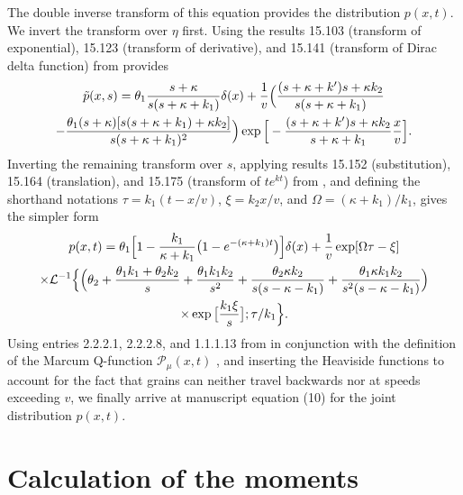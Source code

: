 The double inverse transform of this equation provides the distribution $p(x,t)$.
We invert the transform over $\eta$ first.
Using the results 15.103 (transform of exponential), 15.123 (transform of derivative), and 15.141 (transform of Dirac delta function) from \citet{Arfken1985} provides 
\begin{multline} \tilde{p}(x,s) = \theta_1 \frac{s+\kappa}{s(s+\kappa + k_1)}\delta(x) + \frac{1}{v} \Big(\frac{(s+\kappa+k')s+\kappa k_2}{s(s+\kappa+k_1)} \\- \frac{\theta_1(s+\kappa)[s(s+\kappa+k_1)+\kappa k_2]}{s(s+\kappa+k_1)^2}\Big)
	\exp\Big[-\frac{(s+\kappa+k')s+\kappa k_2}{s+\kappa+k_1}\frac{x}{v}\Big].\end{multline}
Inverting the remaining transform over $s$, applying results 15.152 (substitution), 15.164 (translation), and 15.175 (transform of $te^{kt}$) from \citet{Arfken1985}, and defining the shorthand notations $\tau = k_1(t-x/v)$, $\xi = k_2 x/v$, and $\Omega = (\kappa + k_1)/k_1$, gives the simpler form 
\begin{multline}
	p(x,t) = \theta_1\Big[1-\frac{k_1}{\kappa + k_1}\big(1-e^{-(\kappa + k_1)t}\big)\Big]\delta(x) + \frac{1}{v}\exp[\Omega \tau - \xi]\\
	\times \mathcal{L}^{-1}\Big\{\Big( \theta_2 + \frac{\theta_1k_1+\theta_2 k_2}{s}+\frac{\theta_1k_1k_2}{s^2} + \frac{\theta_2\kappa k_2}{s(s-\kappa-k_1)} + \frac{\theta_1\kappa k_1 k_2}{s^2(s-\kappa-k_1)}\Big)\\
	\times\exp\big[\frac{k_1 \xi}{s}\big];\tau/k_1\Big\}.
\end{multline}
Using entries 2.2.2.1, 2.2.2.8, and 1.1.1.13 from \citet{Prudnikov1992a} in conjunction with the definition of the Marcum Q-function $ \mathcal{P}_\mu(x,t)$ \citep[e.g.,][]{Temme1996}, and inserting the Heaviside functions to account for the fact that grains can neither travel backwards nor at speeds exceeding $v$, we finally arrive at manuscript equation (10) for the joint distribution $p(x,t)$.

\section{Calculation of the moments}
\label{sec:appendixB}

